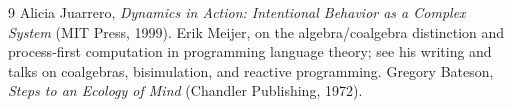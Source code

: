 \documentclass[11pt]{article}
\begin{document}
\begin{thebibliography}{9}
 Alicia Juarrero, \emph{Dynamics in Action:
  Intentional Behavior as a Complex System} (MIT Press, 1999).
 Erik Meijer, on the algebra/coalgebra distinction and
  process-first computation in programming language theory; see his
  writing and talks on coalgebras, bisimulation, and reactive
  programming.
 Gregory Bateson, \emph{Steps to an Ecology of Mind}
  (Chandler Publishing, 1972).
\end{thebibliography}
\end{document}
